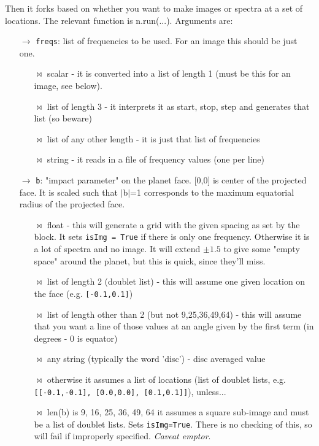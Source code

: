 \documentclass[11pt]{article}
\begin{document}
Then it forks based on whether you want to make images or spectra at a set of locations.  The relevant function is n.run(...).  Arguments are:
\begin{itemize}
\item[$\rightarrow$] \texttt{freqs}:   list of frequencies to be used. For an image this should be just one.
	\begin{itemize}
	\item[$\bowtie$] scalar - it is converted into a list of length 1 (must be this for an image, see below).
	\item[$\bowtie$] list of length 3 - it interprets it as start, stop, step and generates that list (so beware)
        \item[$\bowtie$] list of any other length - it is just that list of frequencies
        \item[$\bowtie$] string - it reads in a file of frequency values (one per line)
	\end{itemize}
\item[$\rightarrow$] \texttt{b}:  "impact parameter" on the planet face.  [0,0] is center of the projected face.  It is scaled such that $|$b$|$=1 corresponds to the maximum equatorial radius of the projected face.
	\begin{itemize}
	\item[$\bowtie$] float - this will generate a grid with the given spacing as set by the block.  It sets \texttt{isImg = True} if there is only one frequency.  Otherwise it is a lot of spectra and no image.  It will extend $\pm 1.5$ to give some "empty space" around the planet, but this is quick, since they'll miss.
	\item[$\bowtie$] list of length 2 (doublet list) - this will assume one given location on the face (e.g. \texttt{[-0.1,0.1]})
	\item[$\bowtie$] list of length other than 2 (but not 9,25,36,49,64) - this will assume that you want a line of those values at an angle given by the first term (in degrees - 0 is equator)
	\item[$\bowtie$] any string (typically the word 'disc') - disc averaged value
	\item[$\bowtie$] otherwise it assumes a list of locations (list of doublet lists, e.g. \texttt{[[-0.1,-0.1], }\texttt{[0.0,0.0], }\texttt{[0.1,0.1]]}), unless...
	\item[$\bowtie$] len(b) is 9, 16, 25, 36, 49, 64 it assumes a square sub-image and must be a list of doublet lists.  Sets \texttt{isImg=True}.  There is no checking of this, so will fail if improperly specified.  {\em Caveat emptor}.

\end{itemize}
\end{itemize}
\end{document}
